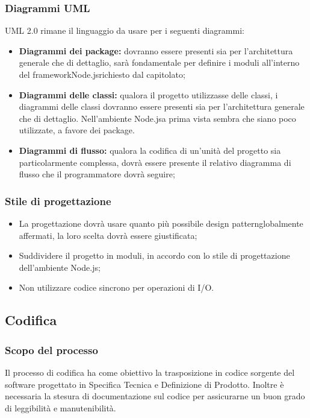 \documentclass[a4paper,11pt]{article}
\begin{document}
			\subsubsection{Diagrammi UML}
			UML 2.0 rimane il linguaggio da usare per i seguenti diagrammi:
			\begin{itemize}
			\item\textbf{Diagrammi dei package\addglos:} dovranno essere presenti sia per l'architettura generale che di dettaglio, sarà fondamentale per definire i moduli all'interno del framework\addglos Node.js\addglos richiesto dal capitolato;
			\item\textbf{Diagrammi delle classi:} qualora il progetto utilizzasse delle classi, i diagrammi delle classi dovranno essere presenti sia per l'architettura generale che di dettaglio. Nell'ambiente Node.js\addglos a prima vista sembra che siano poco utilizzate, a favore dei package\addglos.
			\item\textbf{Diagrammi di flusso:} qualora la codifica di un'unità del progetto sia particolarmente complessa, dovrà essere presente il relativo diagramma di flusso che il programmatore dovrà seguire;
			\end{itemize}
			\subsubsection{Stile di progettazione}
				\begin{itemize}
				\item La progettazione dovrà usare quanto più possibile design pattern\addglos globalmente affermati, la loro scelta dovrà essere giustificata;
				\item Suddividere il progetto in moduli, in accordo con lo stile di progettazione dell'ambiente Node.js\addglos;
				\item Non utilizzare codice sincrono per operazioni di I/O\addglos.
				
				\end{itemize}
			
			
		\subsection{Codifica}
			\subsubsection{Scopo del processo}
			Il processo di codifica ha come obiettivo la trasposizione in codice sorgente del software progettato in Specifica Tecnica e Definizione di Prodotto. Inoltre è necessaria la stesura di documentazione sul codice per assicurarne un buon grado di leggibilità e manutenibilità.
\end{document}
